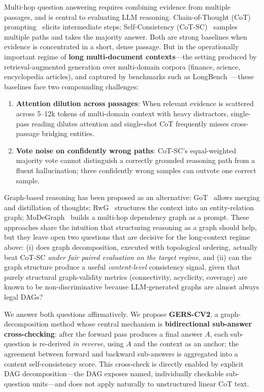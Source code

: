 \documentclass[11pt,a4paper]{article}
\begin{document}
Multi-hop question answering requires combining evidence from multiple passages, and is central to evaluating LLM reasoning. Chain-of-Thought (CoT) prompting~\cite{wei2022cot} elicits intermediate steps; Self-Consistency (CoT-SC)~\cite{wang2023sc} samples multiple paths and takes the majority answer. Both are strong baselines when evidence is concentrated in a short, dense passage. But in the operationally important regime of \textbf{long multi-document contexts}---the setting produced by retrieval-augmented generation over multi-domain corpora (finance, science, encyclopedia articles), and captured by benchmarks such as LongBench~\cite{bai2024longbench}---these baselines face two compounding challenges:

\begin{enumerate}[label=\arabic*.]
\item \textbf{Attention dilution across passages}: When relevant evidence is scattered across 5--12k tokens of multi-domain context with heavy distractors, single-pass reading dilutes attention and single-shot CoT frequently misses cross-passage bridging entities.
\item \textbf{Vote noise on confidently wrong paths}: CoT-SC's equal-weighted majority vote cannot distinguish a correctly grounded reasoning path from a fluent hallucination; three confidently wrong samples can outvote one correct sample.
\end{enumerate}

Graph-based reasoning has been proposed as an alternative: GoT~\cite{besta2024got} allows merging and distillation of thoughts; RwG~\cite{han2025rwg} structures the context into an entity-relation graph; MoDeGraph~\cite{oruche2025modegraph} builds a multi-hop dependency graph as a prompt. These approaches share the intuition that structuring reasoning as a graph should help, but they leave open two questions that are decisive for the long-context regime above: (i) does graph decomposition, executed with topological ordering, actually beat CoT-SC \emph{under fair paired evaluation on the target regime}, and (ii) can the graph structure produce a useful \emph{content-level} consistency signal, given that purely structural graph-validity metrics (connectivity, acyclicity, coverage) are known to be non-discriminative because LLM-generated graphs are almost always legal DAGs?

We answer both questions affirmatively. We propose \textbf{GERS-CV2}, a graph-decomposition method whose central mechanism is \textbf{bidirectional sub-answer cross-checking}: after the forward pass produces a final answer $A$, each sub-question is re-derived \emph{in reverse}, using $A$ and the context as an anchor; the agreement between forward and backward sub-answers is aggregated into a content self-consistency score. This cross-check is directly enabled by explicit DAG decomposition---the DAG exposes named, individually checkable sub-question units---and does not apply naturally to unstructured linear CoT text.
\end{document}
